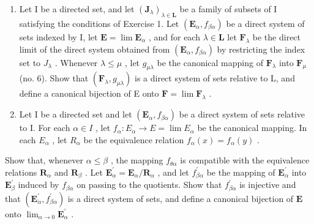 \begin{enumerate}
\def\labelenumi{\arabic{enumi}.}
\setcounter{enumi}{5}
\item
  Let I be a directed set, and let \((\mathbf{J}_{\lambda})_{\lambda \in \mathbf{L}}\) be a family of subsets of I satisfying the conditions of Exercise 1. Let \((\mathbf{E}_{\alpha}, f_{\beta \alpha})\) be a direct system of sets indexed by I, let \(\mathbf{E} = \lim \mathbf{E}_{\alpha}\) , and for each \(\lambda \in \mathbf{L}\) let \(\mathbf{F}_{\lambda}\) be the direct limit of the direct system obtained from \((\mathbf{E}_{\alpha}, f_{\beta \alpha})\) by restricting the index set to \(J_{\lambda}\) . Whenever \(\lambda \leqslant \mu\) , let \(g_{\mu \lambda}\) be the canonical mapping of \(\mathbf{F}_{\lambda}\) into \(\mathbf{F}_{\mu}\) (no. 6). Show that \((\mathbf{F}_{\lambda}, g_{\mu \lambda})\) is a direct system of sets relative to L, and define a canonical bijection of E onto \(\mathbf{F} = \lim \mathbf{F}_{\lambda}\) .
\item
  Let I be a directed set and let \((\mathbf{E}_{\alpha}, f_{\beta\alpha})\) be a direct system of sets relative to I. For each \(\alpha \in I\) , let \(f_{\alpha}: E_{\alpha} \to E = \lim E_{\alpha}\) be the canonical mapping. In each \(E_{\alpha}\) , let \(R_{\alpha}\) be the equivalence relation \(f_{\alpha}(x) = f_{\alpha}(y)\) .
\end{enumerate}

Show that, whenever \(\alpha \leqslant \beta\) , the mapping \(f_{\theta \alpha}\) is compatible with the equivalence relations \(\mathbf{R}_{\alpha}\) and \(\mathbf{R}_{\beta}\) . Let \(\mathbf{E}_{\alpha}^{\prime} = \mathbf{E}_{\alpha} / \mathbf{R}_{\alpha}\) , and let \(f_{\beta \alpha}^{\prime}\) be the mapping of \(\mathbf{E}_{\alpha}^{\prime}\) into \(\mathbf{E}_{\beta}^{\prime}\) induced by \(f_{\beta \alpha}\) on passing to the quotients. Show that \(f_{\beta \alpha}^{\prime}\) is injective and that \((\mathbf{E}_{\alpha}^{\prime}, f_{\beta \alpha}^{\prime})\) is a direct system of sets, and define a canonical bijection of \(\mathbf{E}\) onto \(\lim_{\alpha \to 0} \mathbf{E}_{\alpha}^{\prime}\) .

